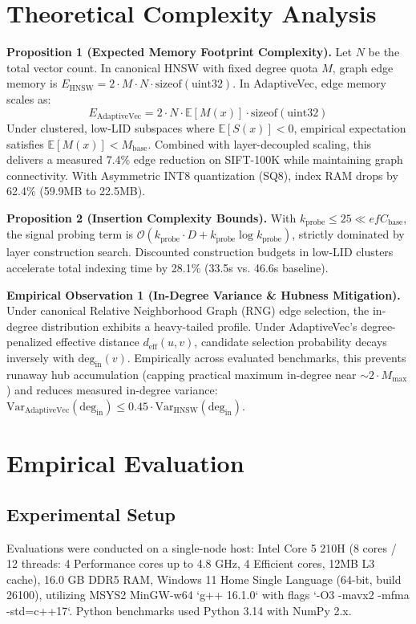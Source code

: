 \documentclass[conference,10pt]{IEEEtran}
\begin{document}
\section{Theoretical Complexity Analysis}

\textbf{Proposition 1 (Expected Memory Footprint Complexity).} Let $N$ be the total vector count. In canonical HNSW with fixed degree quota $M$, graph edge memory is $E_{\text{HNSW}} = 2 \cdot M \cdot N \cdot \text{sizeof}(\text{uint32})$. In AdaptiveVec, edge memory scales as:
\begin{equation}
E_{\text{AdaptiveVec}} = 2 \cdot N \cdot \mathbb{E}[M(x)] \cdot \text{sizeof}(\text{uint32})
\end{equation}
Under clustered, low-LID subspaces where $\mathbb{E}[S(x)] < 0$, empirical expectation satisfies $\mathbb{E}[M(x)] < M_{\text{base}}$. Combined with layer-decoupled scaling, this delivers a measured 7.4\% edge reduction on SIFT-100K while maintaining graph connectivity. With Asymmetric INT8 quantization (SQ8), index RAM drops by 62.4\% (59.9MB to 22.5MB).

\textbf{Proposition 2 (Insertion Complexity Bounds).} With $k_{\text{probe}} \le 25 \ll efC_{\text{base}}$, the signal probing term is $\mathcal{O}(k_{\text{probe}} \cdot D + k_{\text{probe}} \log k_{\text{probe}})$, strictly dominated by layer construction search. Discounted construction budgets in low-LID clusters accelerate total indexing time by 28.1\% (33.5s vs. 46.6s baseline).

\textbf{Empirical Observation 1 (In-Degree Variance \& Hubness Mitigation).} Under canonical Relative Neighborhood Graph (RNG) edge selection, the in-degree distribution exhibits a heavy-tailed profile. Under AdaptiveVec's degree-penalized effective distance $d_{\text{eff}}(u, v)$, candidate selection probability decays inversely with $\text{deg}_{\text{in}}(v)$. Empirically across evaluated benchmarks, this prevents runaway hub accumulation (capping practical maximum in-degree near $\sim 2 \cdot M_{\text{max}}$) and reduces measured in-degree variance: $\text{Var}_{\text{AdaptiveVec}}(\text{deg}_{\text{in}}) \le 0.45 \cdot \text{Var}_{\text{HNSW}}(\text{deg}_{\text{in}})$.

\section{Empirical Evaluation}

\subsection{Experimental Setup}
Evaluations were conducted on a single-node host: Intel Core 5 210H (8 cores / 12 threads: 4 Performance cores up to 4.8 GHz, 4 Efficient cores, 12MB L3 cache), 16.0 GB DDR5 RAM, Windows 11 Home Single Language (64-bit, build 26100), utilizing MSYS2 MinGW-w64 `g++ 16.1.0` with flags `-O3 -mavx2 -mfma -std=c++17`. Python benchmarks used Python 3.14 with NumPy 2.x.
\end{document}
